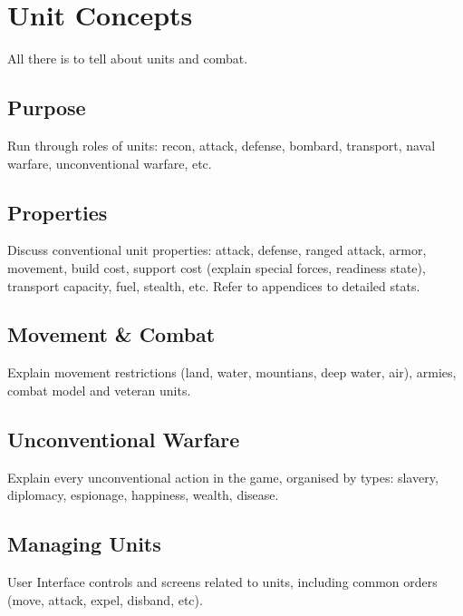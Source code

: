 \chapter{Unit Concepts}
All there is to tell about units and combat.

\section{Purpose}
Run through roles of units: recon, attack, defense, bombard, transport, naval warfare, unconventional warfare, etc.

\section{Properties}
Discuss conventional unit properties: attack, defense, ranged attack, armor, movement, build cost, support cost (explain special forces, readiness state), transport capacity, fuel, stealth, etc. Refer to appendices to detailed stats.

\section{Movement \& Combat}
Explain movement restrictions (land, water, mountians, deep water, air), armies, combat model and veteran units.

\section{Unconventional Warfare}
Explain every unconventional action in the game, organised by types: slavery, diplomacy, espionage, happiness, wealth, disease.

\section{Managing Units}
User Interface controls and screens related to units, including common orders (move, attack, expel, disband, etc).

